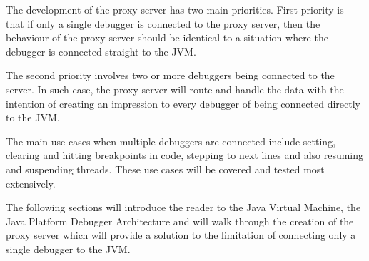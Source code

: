 \documentclass[..thesis.tex]{subfiles}
\begin{document}
The development of the proxy server has two main priorities. 
First priority is that if only a single debugger is connected to the proxy server, then the behaviour of the proxy server should be identical to a situation where the debugger is connected straight to the JVM.

The second priority involves two or more debuggers being connected to the server. 
In such case, the proxy server will route and handle the data with the intention of creating an impression to every debugger of being connected directly to the JVM.

The main use cases when multiple debuggers are connected include setting, clearing and hitting breakpoints in code, stepping to next lines and also resuming and suspending threads.
These use cases will be covered and tested most extensively.

The following sections will introduce the reader to the Java Virtual Machine, the Java Platform Debugger Architecture and will walk through the creation of the proxy server which will provide a solution to the limitation of connecting only a single debugger to the JVM.
\end{document}
